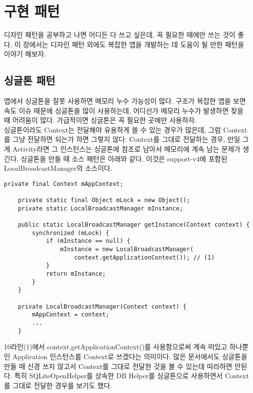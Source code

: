 \chapter{구현 패턴}
디자인 패턴을 공부하고 나면 어디든 다 쓰고 싶은데, 꼭 필요한 때에만 쓰는 것이 좋다.
이 장에서는 디자인 패턴 외에도 복잡한 앱을 개발하는 데 도움이 될 만한 패턴을 이야기 해보자.

\section{싱글톤 패턴}
\label{sec:singleton}
앱에서 싱글톤을 잘못 사용하면 메모리 누수 가능성이 많다. 
구조가 복잡한 앱을 보면 속도 이슈 때문에 싱글톤을 많이 사용하는데, 어디선가 메모리 누수가 발생하면 찾을 때 어려움이 많다. 
가급적이면 싱글톤은 꼭 필요한 곳에만 사용하자.\\

싱글톤이라도 Context는 전달해야 유용하게 쓸 수 있는 경우가 많은데, 그럼 Context를 그냥 전달하면 되는가 하면 그렇지 않다.
Context를 그대로 전달하는 경우, 만일 그게 Activity라면 그 인스턴스는 싱글톤에 참조로 남아서 메모리에 계속 남는 문제가 생긴다.
싱글톤을 만들 때 소스 패턴은 아래와 같다. 이것은 support-v4에 포함된 LocalBroadcastManager의 소스이다.
\begin{lstlisting}[frame=single, caption=LocalBroadcastManager.java]
    private final Context mAppContext;
	
    private static final Object mLock = new Object();
    private static LocalBroadcastManager mInstance;

    public static LocalBroadcastManager getInstance(Context context) {
        synchronized (mLock) {
            if (mInstance == null) {
                mInstance = new LocalBroadcastManager(
                	context.getApplicationContext()); // (1)
            }
            return mInstance;
        }
    }

    private LocalBroadcastManager(Context context) {
        mAppContext = context;
        ...
    }
\end{lstlisting} 
10라인(1)에서 context.getApplicationContext()를 사용함으로써 계속 떠있고 하나뿐인 Application 인스턴스를 Context로 쓰겠다는 의미이다.
많은 문서에서도 싱글톤을 만들 때 신경 쓰지 않고서 Context를 그대로 전달한 것을 볼 수 있는데 따라하면 안된다.
특히 SQLiteOpenHelper를 상속한 DB Helper를 싱글톤으로 사용하면서 Context를 그대로 전달한 경우를 보기도 했다.\\

